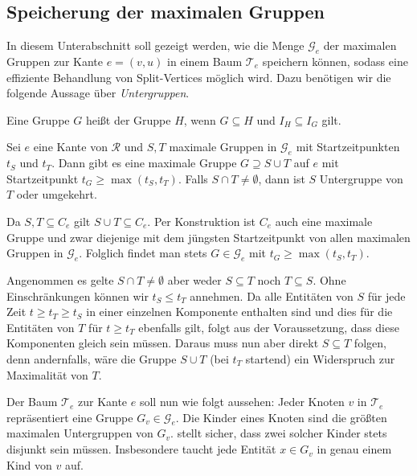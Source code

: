\subsection{Speicherung der maximalen Gruppen} %
\label{sub:speicherung_der_maximalen_gruppen}
In diesem Unterabschnitt soll gezeigt werden, wie die Menge $\mathcal{G}_e$ der maximalen Gruppen zur Kante $e=(v,u)$ in einem Baum $\mathcal{T}_e$ speichern können, sodass eine effiziente Behandlung von Split-Vertices möglich wird.
Dazu benötigen wir die folgende Aussage über \emph{Untergruppen}.

\begin{definition}[{name=[Untergruppe]}]
	Eine Gruppe $G$ heißt  der Gruppe $H$, wenn $G \subseteq H$ und $I_H \subseteq I_G$ gilt.
\end{definition}

\begin{lemma}[{name={\cite[Lem.~8]{buchin2015}}},label=lem:untergruppen]
	Sei $e$ eine Kante von $\mathcal{R}$ und $S,T$ maximale Gruppen in $\mathcal{G}_e$ mit Startzeitpunkten $t_S$ und $t_T$.
	Dann gibt es eine maximale Gruppe $G \supseteq S \cup T$ auf $e$ mit Startzeitpunkt $t_G \ge \max(t_S,t_T)$.
	Falls $S \cap T \neq \emptyset$, dann ist $S$ Untergruppe von $T$ oder umgekehrt.
\end{lemma}
\begin{beweis}
	Da $S,T \subseteq C_e$ gilt $S \cup T \subseteq C_e$.
	Per Konstruktion ist $C_e$ auch eine maximale Gruppe und zwar diejenige mit dem jüngsten Startzeitpunkt von allen maximalen Gruppen in $\mathcal{G}_e$.
	Folglich findet man stets $G \in \mathcal{G}_e$ mit $t_G \ge \max(t_S,t_T)$.
	
	Angenommen es gelte $S \cap T \neq \emptyset$ aber weder $S \subseteq T$ noch $T \subseteq S$.
	Ohne Einschränkungen können wir $t_S \le t_T$ annehmen.
	Da alle Entitäten von $S$ für jede Zeit $t \ge t_T \ge t_S$ in einer einzelnen Komponente enthalten sind und dies für die Entitäten von $T$ für $t \ge t_T$ ebenfalls gilt, folgt aus der Voraussetzung, dass diese Komponenten gleich sein müssen.
	Daraus muss nun aber direkt $S \subseteq T $ folgen, denn andernfalls, wäre die Gruppe $S \cup T$ (bei $t_T$ startend) ein Widerspruch zur Maximalität von $T$.
\end{beweis}

Der Baum $\mathcal{T}_e$ zur Kante $e$ soll nun wie folgt aussehen: Jeder Knoten $v$ in $\mathcal{T}_e$ repräsentiert eine Gruppe $G_v \in \mathcal{G}_e$.
Die Kinder eines Knoten sind die größten maximalen Untergruppen von $G_v$.
 stellt sicher, dass zwei solcher Kinder stets disjunkt sein müssen.
Insbesondere taucht jede Entität $x \in G_v$ in genau einem Kind von $v$ auf.

